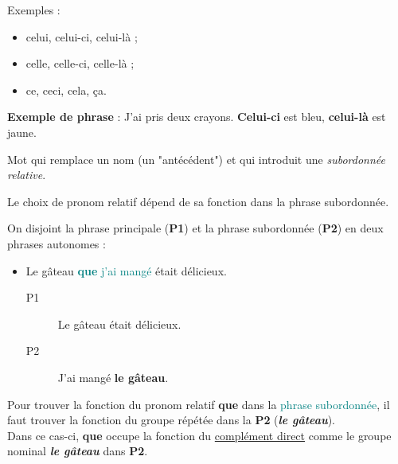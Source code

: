 \documentclass[10pt, french]{article}
\begin{document}
\begin{multicols*}{2}
\begin{definitionNOHFILLsub}
\tcbline

Exemples :
\begin{itemize}
	\item	celui, celui-ci, celui-là ;
	\item	celle, celle-ci, celle-là ;
	\item	ce, ceci, cela, ça.
\end{itemize}

\textbf{Exemple de phrase} : J'ai pris deux crayons. \textbf{Celui-ci} est bleu, \textbf{celui-là} est jaune.
\end{definitionNOHFILLsub}

\begin{definitionNOHFILLsub}
Mot qui remplace un nom (un "antécédent") et qui introduit une \textit{subordonnée relative}.

\tcbline

Le choix de pronom relatif dépend de sa fonction dans la phrase subordonnée.
\begin{astuces}
On disjoint la phrase principale (\textbf{P1}) et la phrase subordonnée (\textbf{P2}) en deux phrases autonomes :
\begin{itemize}
	\item	Le gâteau \textcolor{teal}{\textbf{que} j'ai mangé} était délicieux.
		\begin{description}
		\item[P1]	Le gâteau était délicieux.
		\item[P2]	J'ai mangé \textbf{le gâteau}.
		\end{description}
\end{itemize}

Pour trouver la fonction du pronom relatif \textbf{que} dans la \textcolor{teal}{phrase subordonnée}, il faut trouver la fonction du groupe répétée dans la \textbf{P2} (\textit{\textbf{le gâteau}}).\\
Dans ce cas-ci, \textbf{que} occupe la fonction du \underline{complément direct} comme le groupe nominal \textit{\textbf{le gâteau}} dans \textbf{P2}.
\end{astuces}


\end{definitionNOHFILLsub}
\end{multicols*}
\end{document}
